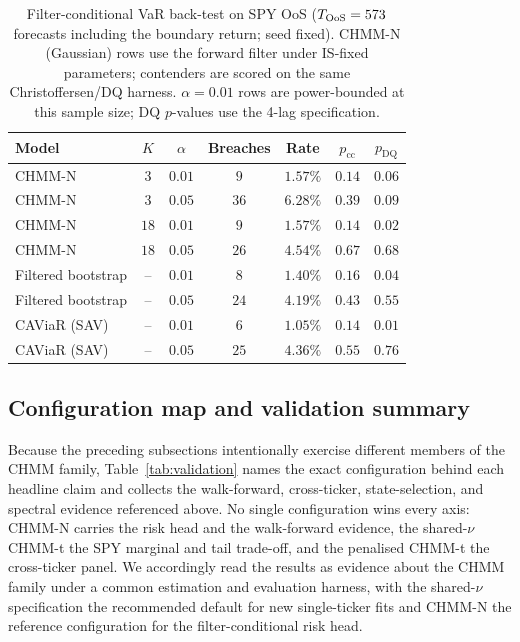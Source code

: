 \begin{table}[t]
\centering
\caption{Filter-conditional VaR back-test on SPY OoS ($T_{\text{OoS}} = 573$ forecasts including the boundary return; seed fixed). CHMM-N (Gaussian) rows use the forward filter under IS-fixed parameters; contenders are scored on the same Christoffersen/DQ harness. $\alpha = 0.01$ rows are power-bounded at this sample size; DQ $p$-values use the 4-lag specification.}
\label{tab:cond_var}
\footnotesize
\setlength{\tabcolsep}{5pt}
\begin{tabular}{l c c c c c c}
\toprule
Model & $K$ & $\alpha$ & Breaches & Rate & $p_{\text{cc}}$ & $p_{\text{DQ}}$ \\
\midrule
CHMM-N             & $3$  & $0.01$ & $9$  & $1.57\%$ & $0.14$ & $0.06$ \\
CHMM-N             & $3$  & $0.05$ & $36$ & $6.28\%$ & $0.39$ & $0.09$ \\
CHMM-N             & $18$ & $0.01$ & $9$  & $1.57\%$ & $0.14$ & $0.02$ \\
CHMM-N             & $18$ & $0.05$ & $26$ & $4.54\%$ & $0.67$ & $0.68$ \\
\midrule
Filtered bootstrap & --   & $0.01$ & $8$  & $1.40\%$ & $0.16$ & $0.04$ \\
Filtered bootstrap & --   & $0.05$ & $24$ & $4.19\%$ & $0.43$ & $0.55$ \\
CAViaR (SAV)       & --   & $0.01$ & $6$  & $1.05\%$ & $0.14$ & $0.01$ \\
CAViaR (SAV)       & --   & $0.05$ & $25$ & $4.36\%$ & $0.55$ & $0.76$ \\
\bottomrule
\end{tabular}
\end{table}

\subsection{Configuration map and validation summary}
\label{sec:res_validation}

Because the preceding subsections intentionally exercise different members of the CHMM family, Table~\ref{tab:validation} names the exact configuration behind each headline claim and collects the walk-forward, cross-ticker, state-selection, and spectral evidence referenced above. No single configuration wins every axis: CHMM-N carries the risk head and the walk-forward evidence, the shared-$\nu$ CHMM-t the SPY marginal and tail trade-off, and the penalised CHMM-t the cross-ticker panel. We accordingly read the results as evidence about the CHMM family under a common estimation and evaluation harness, with the shared-$\nu$ specification the recommended default for new single-ticker fits and CHMM-N the reference configuration for the filter-conditional risk head.
